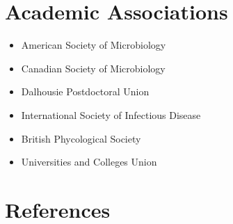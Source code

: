 \documentclass[10pt,a4paper,sans]{moderncv}        %
\begin{document}
\section{Academic Associations}
\begin{itemize}
    \item American Society of Microbiology
    \item Canadian Society of Microbiology
    \item Dalhousie Postdoctoral Union
    \item International Society of Infectious Disease
    \item British Phycological Society
    \item Universities and Colleges Union
\end{itemize}



\section{References}
\end{document}
